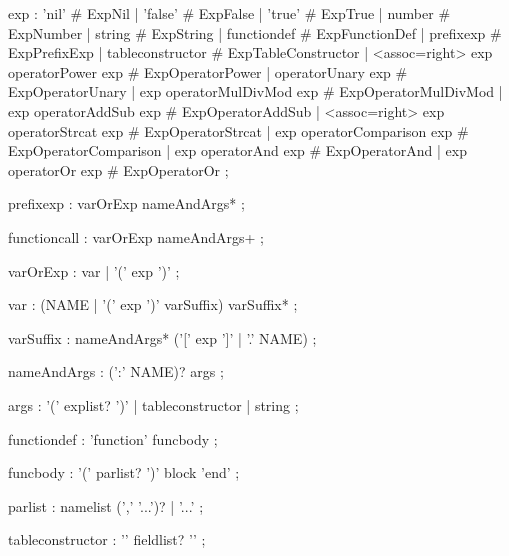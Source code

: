 exp
    : 'nil'                                                                         # ExpNil
    | 'false'                                                                       # ExpFalse
    | 'true'                                                                        # ExpTrue
    | number                                                                        # ExpNumber
    | string                                                                        # ExpString
    | functiondef                                                                   # ExpFunctionDef
    | prefixexp                                                                     # ExpPrefixExp
    | tableconstructor                                                              # ExpTableConstructor
    | <assoc=right> exp operatorPower exp                                           # ExpOperatorPower
    | operatorUnary exp                                                             # ExpOperatorUnary
    | exp operatorMulDivMod exp                                                     # ExpOperatorMulDivMod
    | exp operatorAddSub exp                                                        # ExpOperatorAddSub
    | <assoc=right> exp operatorStrcat exp                                          # ExpOperatorStrcat
    | exp operatorComparison exp                                                    # ExpOperatorComparison
    | exp operatorAnd exp                                                           # ExpOperatorAnd
    | exp operatorOr exp                                                            # ExpOperatorOr
    ;

prefixexp
    : varOrExp nameAndArgs*
    ;

functioncall
    : varOrExp nameAndArgs+
    ;

varOrExp
    : var | '(' exp ')'
    ;

var
    : (NAME | '(' exp ')' varSuffix) varSuffix*
    ;

varSuffix
    : nameAndArgs* ('[' exp ']' | '.' NAME)
    ;

nameAndArgs
    : (':' NAME)? args
    ;

args
    : '(' explist? ')' | tableconstructor | string
    ;

functiondef
    : 'function' funcbody
    ;

funcbody
    : '(' parlist? ')' block 'end'
    ;

parlist
    : namelist (',' '...')? | '...'
    ;

tableconstructor
    : '{' fieldlist? '}'
    ;

